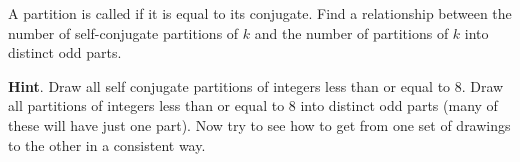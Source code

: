\documentclass{book}
\begin{document}
\setcounter{cpjt}{305}
\addtocounter{cpjt}{-1}
\begin{activity}\label{activity-298}
\hypertarget{p-1506}{}%
A partition is called  if it is equal to its conjugate. Find a relationship between the number of self-conjugate partitions of \(k\) and the number of partitions of \(k\) into distinct odd parts.%
\par\smallskip%
\noindent\textbf{Hint}.\hypertarget{hint-191}{}\quad%
\hypertarget{p-1507}{}%
Draw all self conjugate partitions of integers less than or equal to 8.  Draw all partitions of integers less than or equal to 8 into distinct odd parts (many of these will have just one part). Now try to see how to get from one set of drawings to the other in a consistent way.%
\par\smallskip%
\noindent\end{activity}

\clearpage
\end{document}
